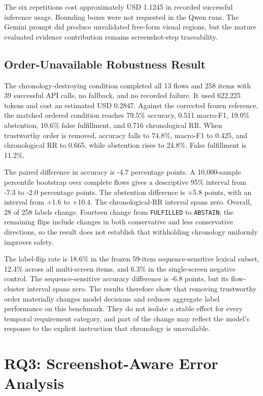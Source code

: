 The six repetitions cost approximately USD 1.1245 in recorded successful
inference usage. Bounding boxes were not requested in the Qwen runs. The Gemini
prompt did produce unvalidated free-form visual regions, but the mature
evaluated evidence contribution remains screenshot-step traceability.

\subsection{Order-Unavailable Robustness Result}\label{order-unavailable-robustness-result}

The chronology-destroying condition completed all 13 flows and 258 items with
39 successful API calls, no fallback, and no recorded failure. It used 622,225
tokens and cost an estimated USD 0.2847. Against the corrected frozen
reference, the matched ordered condition reaches 79.5\% accuracy, 0.511 macro-F1,
19.0\% abstention, 10.6\% false fulfillment, and 0.716 chronological RR. When
trustworthy order is removed, accuracy falls to 74.8\%, macro-F1 to 0.425, and
chronological RR to 0.665, while abstention rises to 24.8\%. False fulfillment is
11.2\%.

The paired difference in accuracy is -4.7 percentage points. A 10,000-sample
percentile bootstrap over complete flows gives a descriptive 95\% interval from
-7.3 to -2.0 percentage points. The abstention difference is +5.8 points, with
an interval from +1.6 to +10.4. The chronological-RR interval spans zero. Overall,
28 of 258 labels change. Fourteen change from \texttt{FULFILLED} to \texttt{ABSTAIN}; the
remaining flips include changes in both conservative and less conservative
directions, so the result does not establish that withholding chronology
uniformly improves safety.

The label-flip rate is 18.6\% in the frozen 59-item sequence-sensitive lexical
subset, 12.4\% across all multi-screen items, and 6.3\% in the single-screen
negative control. The sequence-sensitive accuracy difference is -6.8 points,
but its flow-cluster interval spans zero. The results therefore show that
removing trustworthy order materially changes model decisions and reduces
aggregate label performance on this benchmark. They do not isolate a stable
effect for every temporal requirement category, and part of the change may
reflect the model's response to the explicit instruction that chronology is
unavailable.

\section{RQ3: Screenshot-Aware Error Analysis}\label{rq3-screenshot-aware-error-analysis}


